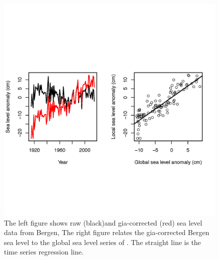 \documentclass[draft,linenumbers]{agujournal}
\providecommand{\DIFdelend}{} %
\providecommand{\DIFaddbeginFL}{} %
\providecommand{\DIFaddendFL}{} %
\providecommand{\DIFdelbeginFL}{} %
\providecommand{\DIFdelendFL}{} %
\begin{document}
\DIFdelend \begin{figure}[!hbpt]
\begin{center}
\DIFdelbeginFL %
\DIFdelendFL \DIFaddbeginFL \includegraphics[width=\linewidth]{bergenfit.png}
\DIFaddendFL \caption{ The left figure shows raw (black)and gia-corrected (red) sea level data from Bergen, The right figure relates the gia-corrected Bergen sea level to the global sea level series of \citet{csiro}. The straight line is the time series regression line.}
\label{fig:bergenobs}
\end{center}
\end{figure}
\end{document}
